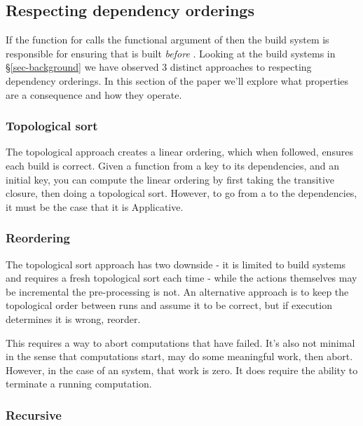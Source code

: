 \subsection{Respecting dependency orderings}

If the  function for  calls the functional argument of  then the build system is responsible for ensuring that  is built \textit{before} . Looking at the build systems in \S\ref{sec-background} we have observed 3 distinct approaches to respecting dependency orderings. In this section of the paper we'll explore what properties are a consequence and how they operate.

\subsubsection{Topological sort}

The topological approach creates a linear ordering, which when followed, ensures each build is correct. Given a function from a key to its dependencies, and an initial key, you can compute the linear ordering by first taking the transitive closure, then doing a topological sort. However, to go from a  to the dependencies, it must be the case that it is Applicative.


\subsubsection{Reordering}

The topological sort approach has two downside - it is limited to  build systems and requires a fresh topological sort each time - while the actions themselves may be incremental the pre-processing is not. An alternative approach is to keep the topological order between runs and assume it to be correct, but if execution determines it is wrong, reorder.

This requires a way to abort computations that have failed. It's also not minimal in the sense that computations start, may do some meaningful work, then abort. However, in the case of an  system, that work is zero. It does require the ability to terminate a running computation.

\subsubsection{Recursive}

